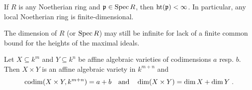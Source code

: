 \documentclass[a4paper,parskip=half,numbers=enddot, DIV=12]{scrreprt}
\begin{document}
\begin{cor}
    If $R$ is any Noetherian ring and $\mathfrak{p}\in\operatorname{Spec} R$, then $\operatorname{ht}(\mathfrak{p}) < \infty$. In particular, any local Noetherian ring is finite-dimensional.
\end{cor}
\begin{rem*}
    The dimension of $R$ (or $\operatorname{Spec} R$) may still be infinite for lack of a finite common bound for the heights of the maximal ideals.
\end{rem*}
\begin{prop}
    Let $X\subseteq k^m$ and $Y\subseteq k^n$ be affine algebraic varieties of codimensions $a$ resp. $b$. Then $X\times Y$ is an affine algebraic variety in $k^{m+n}$ and
    \begin{align*}
    	\operatorname{codim}(X\times Y, k^{m+n})=a+b\quad\text{and}\quad\dim(X\times Y)=\dim X+\dim Y\;.
    \end{align*}
\end{prop}
\end{document}
